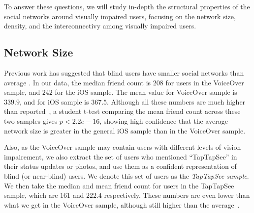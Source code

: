 \documentclass{sigchi}
\begin{document}
To answer these questions, we will study in-depth the structural properties of the social networks around visually impaired users, focusing on the network size, density, and the interconnectivy among visually impaired users. 




\subsection{Network Size}

Previous work has suggested that blind users have smaller social networks than average \cite{brady2013cscw}. In our data, the median friend count is $208$ for users in the VoiceOver sample, and $242$ for the iOS sample. The mean value for VoiceOver sample is $339.9$, and for iOS sample is $367.5$. Although all these numbers are much higher than reported~\cite{brady2013cscw}, a student t-test comparing the mean friend count across these two samples gives $p<2.2e-16$, showing high confidence that the average network size is greater in the general iOS sample than in the VoiceOver sample. 

Also, as the VoiceOver sample may contain users with different levels of vision impairement, we also extract the set of users who mentioned ``TapTapSee'' in their status updates or photos, and use them as a confident representation of blind (or near-blind) users. We denote this set of users as the \emph{TapTapSee sample}. We then take the median and mean friend count for users in the TapTapSee sample, which are $161$ and $222.4$ respectively. These numbers are even lower than what we get in the VoiceOver sample, although still higher than the average~\cite{ugander2011}.
\end{document}
